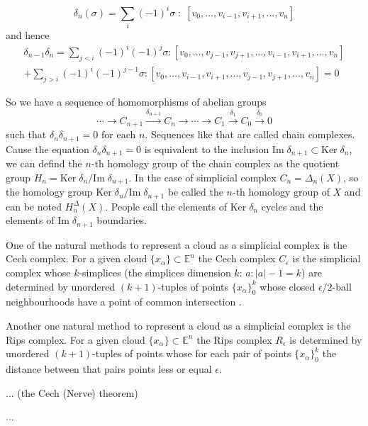 \documentclass[a4paper, 12pt]{article}
\newcommand{\Image}{\text{Im}\;}
\newcommand{\Ker}{\text{Ker}\;}
\begin{document}
$$\delta_n(\sigma) = \sum_i (-1)^i \sigma \;:\; [v_0, ..., v_{i-1}, v_{i+1}, ..., v_n]$$
and hence
$$
\begin{matrix}
	\delta_{n-1}\delta_{n} = 
	\sum\limits_{j<i} (-1)^i(-1)^{j} \sigma : [v_0, ..., v_{j-1}, v_{j+1}, ..., v_{i-1}, v_{i+1}, ..., v_n] \\
	+ 
	\sum\limits_{j>i} (-1)^i(-1)^{j-1} \sigma : [v_0, ..., v_{i-1}, v_{i+1}, ..., v_{j-1}, v_{j+1}, ..., v_n] = 0
\end{matrix}
$$
\par So we have a sequence of homomorphisms of abelian groups
$$
	\cdots \to 
	C_{n+1}  \xrightarrow{\delta_{n+1}}
	C_{n}  \to
	\cdots \to 
	C_{1}  \xrightarrow{\delta_{1}}
	C_{0}  \xrightarrow{\delta_{0}} 0
$$
such that $\delta_n\delta_{n+1} = 0$ for each $n$. Sequences like that are called chain complexes. Cause the equation $\delta_n\delta_{n+1} = 0$ is equivalent to the inclusion $\Image \delta_{n+1} \subset \Ker \delta_n$, we can defind the $n$-th homology group of the chain complex as the quotient group $H_n = \Ker\delta_n/\Image\delta_{n+1}$. In the case of simplicial complex $C_n = \Delta_n(X)$, so the homology group $\Ker\delta_n/\Image\delta_{n+1}$ be called the $n$-th homology group of $X$ and can be noted $H_n^\Delta(X)$. People call the elements of $\Ker\delta_n$ cycles and the elements of $\Image\delta_{n+1}$ boundaries. \cite{hatcher}

\par One of the natural methods to represent a cloud as a simplicial complex is the Cech complex.  For a given cloud $\{x_\alpha\}\subset\mathbb{E}^n$ the Cech complex $C_\epsilon$ is the simplicial complex whose $k$-simplices (the simplices dimension $k$: $a: |a|-1 = k$) are determined by unordered $(k+1)$-tuples of points $\{x_\alpha\}_0^k$ whose closed $\epsilon/2$-ball neighbourhoods have a point of common intersection \cite{ghrist}.
\par Another one natural method to represent a cloud as a simplicial complex is the Rips complex. For a given cloud $\{x_\alpha\}\subset\mathbb{E}^n$ the Rips complex $R_\epsilon$ is determined by unordered $(k+1)$-tuples of points whose for each pair of points $\{x_\alpha\}_0^k$ the distance between that pairs points less or equal $\epsilon$.
\par ... (the Cech (Nerve) theorem) 
\par ...
\end{document}
